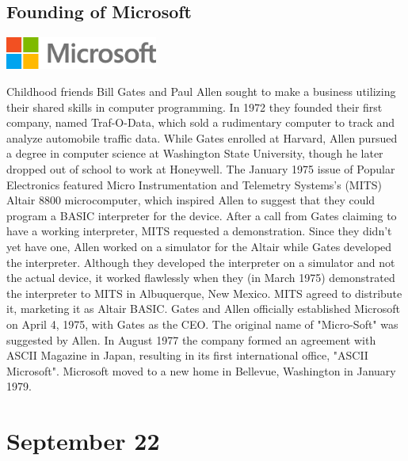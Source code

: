 \documentclass[11pt]{report}
\begin{document}
\subsection{Founding of Microsoft}
\vspace{2mm}\begin{center}\includegraphics[width=5cm]{./img/microsoftLogo.jpg}\end{center}
Childhood friends Bill Gates and Paul Allen sought to make a business utilizing their shared skills in computer programming. In 1972 they founded their first company, named Traf-O-Data, which sold a rudimentary computer to track and analyze automobile traffic data. While Gates enrolled at Harvard, Allen pursued a degree in computer science at Washington State University, though he later dropped out of school to work at Honeywell. The January 1975 issue of Popular Electronics featured Micro Instrumentation and Telemetry Systems's (MITS) Altair 8800 microcomputer, which inspired Allen to suggest that they could program a BASIC interpreter for the device. After a call from Gates claiming to have a working interpreter, MITS requested a demonstration. Since they didn't yet have one, Allen worked on a simulator for the Altair while Gates developed the interpreter. Although they developed the interpreter on a simulator and not the actual device, it worked flawlessly when they (in March 1975) demonstrated the interpreter to MITS in Albuquerque, New Mexico. MITS agreed to distribute it, marketing it as Altair BASIC. Gates and Allen officially established Microsoft on April 4, 1975, with Gates as the CEO. The original name of "Micro-Soft" was suggested by Allen. In August 1977 the company formed an agreement with ASCII Magazine in Japan, resulting in its first international office, "ASCII Microsoft". Microsoft moved to a new home in Bellevue, Washington in January 1979.
\section{September 22}
\end{document}
